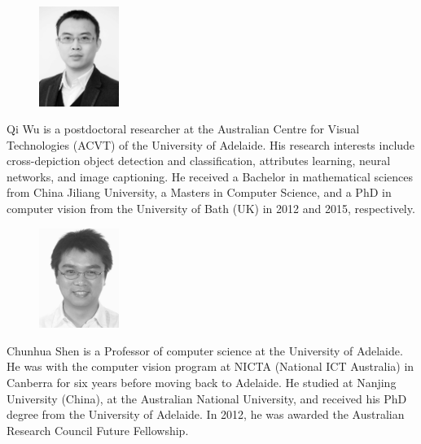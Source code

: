 \documentclass[10pt,journal,compsoc]{IEEEtran}
\begin{document}

%


%
%
%

\vspace{-1cm}
\begin{figure}
\vspace{-10pt}
  \includegraphics[width=7em]{author-wu_bw.jpg}
\end{figure}
\begin{IEEEbiographynophoto}{Qi Wu}
is a postdoctoral researcher at the Australian Centre for Visual Technologies (ACVT) of the University of Adelaide. His research interests include cross-depiction object detection and classification, attributes learning, neural networks, and image captioning. He received a Bachelor in mathematical sciences from China Jiliang University, a Masters in Computer Science, and a PhD in computer vision from the University of Bath (UK) in 2012 and 2015, respectively.
\end{IEEEbiographynophoto}

\vspace{-1cm}
\begin{figure}
\vspace{-10pt}
  \includegraphics[width=7em]{author-shen.jpg}
\end{figure}
\begin{IEEEbiographynophoto}{Chunhua Shen}
is a Professor of computer science at the University of Adelaide. He was with the computer vision program at NICTA (National ICT Australia) in Canberra for six years before moving back to Adelaide. He studied at Nanjing University (China), at the Australian National University, and received his PhD degree from the University of Adelaide. In 2012, he was awarded the Australian Research Council Future Fellowship.
\end{IEEEbiographynophoto}
\end{document}
